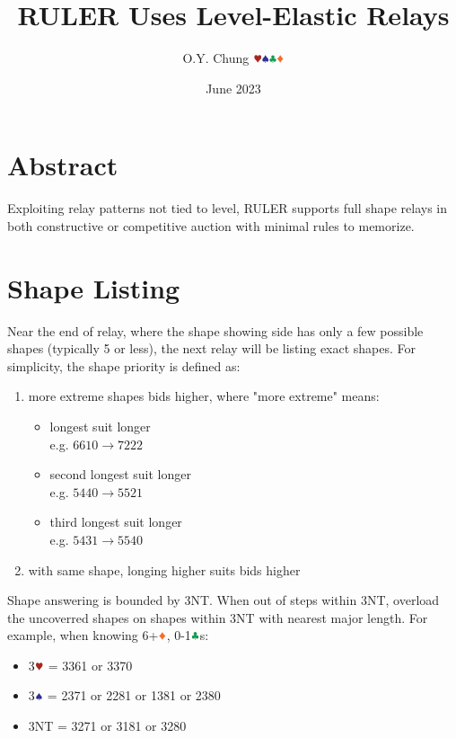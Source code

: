 \documentclass{article}
\title{RULER Uses Level-Elastic Relays}
\author{O.Y. Chung $\hhh\sss\ccc\ddd$}
\date{June 2023}
\begin{document}
\maketitle
\begin{multicols}{2}
\begin{CJK*}{UTF8}{gt}

\section{Abstract}
Exploiting relay patterns not tied to level, RULER supports full shape relays in both constructive or competitive auction with minimal rules to memorize.

\section{Shape Listing}
Near the end of relay, where the shape showing side has only a few possible shapes (typically 5 or less), the next relay will be listing exact shapes. For simplicity, the shape priority is defined as:

\begin{enumerate}
    \item more extreme shapes bids higher, where "more extreme" means:
    \begin{itemize}
        \item longest suit longer \\
            e.g. $6610 \rightarrow 7222$
        \item second longest suit longer \\
            e.g. $5440 \rightarrow 5521$
        \item third longest suit longer \\
            e.g. $5431 \rightarrow 5540$
    \end{itemize}
    \item with same shape, longing higher suits bids higher
\end{enumerate}

\noindent Shape answering is bounded by 3NT. When out of steps within 3NT, overload the uncoverred shapes on shapes within 3NT with nearest major length. For example, when knowing 6+$\ddd$, 0-1$\ccc$s:
\begin{itemize}
    \item 3$\hhh$ = 3361 or 3370
    \item 3$\sss$ = 2371 or 2281 or 1381 or 2380
    \item 3NT = 3271 or 3181 or 3280
\end{itemize}


\end{CJK*}
\end{multicols}
\end{document}

